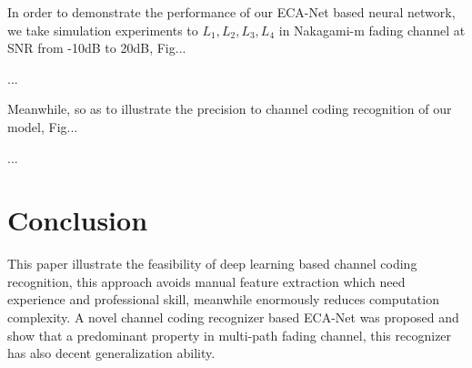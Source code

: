 \documentclass[conference]{IEEEtran}
\begin{document}
In order to demonstrate the performance of our ECA-Net based neural network, we take simulation experiments to $L_1, L_2, L_3, L_4$ in Nakagami-m fading channel at SNR from -10dB to 20dB, Fig...

...

Meanwhile, so as to illustrate the precision to channel coding recognition of our model, Fig...

...


\section{Conclusion}
This paper illustrate the feasibility of deep learning based channel coding recognition, this approach avoids manual feature extraction which need experience and professional skill, meanwhile enormously reduces computation complexity. A novel channel coding recognizer based ECA-Net was proposed and show that a predominant property in multi-path fading channel, this recognizer has also decent generalization ability.

 

\end{document}
